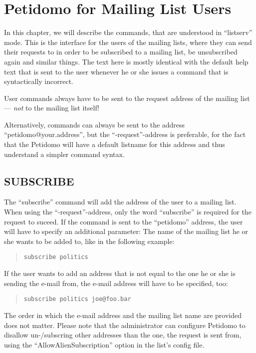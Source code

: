 \documentclass[a4paper,10pt]{scrreprt}
\begin{document}
\chapter{Petidomo for Mailing List Users}
\label{petidomo as user}

In this chapter, we will describe the commands, that are understood in
``listserv'' mode. This is the interface for the users of the mailing
lists, where they can send their requests to in order to be subscribed
to a mailing list, be unsubscribed again and similar things. The text
here is mostly identical with the default help text that is sent to
the user whenever he or she issues a command that is syntactically
incorrect.

User commands always have to be sent to the request address of
the mailing list --- \emph{not} to the mailing list itself!

Alternatively, commands can always be sent to the address
``peti\-do\-mo@your.ad\-dress'', but the ``-request''-address is
preferable, for the fact that the Petidomo will have a default
listname for this address and thus understand a simpler command
syntax.

\section{SUBSCRIBE}

The ``subscribe'' command will add the address of the user to a
mailing list. When using the ``-request''-address, only the word
``subscribe'' is required for the request to suceed. If the command is
sent to the ``petidomo'' address, the user will have to specify an
additional parameter: The name of the mailing list he or she wants to
be added to, like in the following example:
\begin{quote}
\begin{verbatim}
subscribe politics
\end{verbatim}
\end{quote}

If the user wants to add an address that is not equal to the one he or
she is sending the e-mail from, the e-mail address will have to be
specified, too:
\begin{quote}
\begin{verbatim}
subscribe politics joe@foo.bar
\end{verbatim}
\end{quote}

The order in which the e-mail address and the mailing list name are
provided does not matter. Please note that the administrator can
configure Petidomo to disallow un-/subscring other addresses than
the one, the request is sent from, using the
``AllowAlienSubscription'' option in the list's config file.
\end{document}
